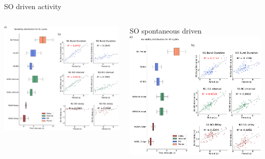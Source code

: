 \documentclass[aspectratio=43]{beamer}
\begin{document}
\begin{frame}{SO driven activity}
{\begin{columns}
\begin{column}{0.5\textwidth}
			\includegraphics[width=\textwidth]{invariants/data/SUSSEX/SO_driven/images/panel_with_intervals_boxplot_invariants.pdf}
		\end{column}
		\begin{column}{0.5\textwidth}
			\centering SO spontaneous driven
			\includegraphics[width=\textwidth]{invariants/data/SUSSEX/prep4_so_driven_2/images/panel_with_intervals_boxplot_invariants.pdf}
		\end{column}
	\end{columns}
}

\end{frame}
\end{document}
